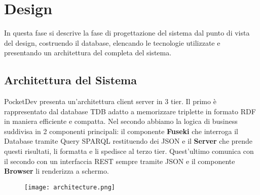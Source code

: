 \section{Design}
In questa fase si descrive la fase di progettazione del sistema dal punto di vista del design, costruendo il database, elencando le tecnologie utilizzate e presentando un architettura del completa del sistema.
\subsection{Architettura del Sistema}
PocketDev presenta un'architettura client server in 3 tier. Il primo è rappresentato dal database TDB adatto a memorizzare triplette in formato RDF in maniera efficiente e compatta. Nel secondo abbiamo la logica di business suddivisa in 2 componenti principali: il componente \textbf{Fuseki} che interroga il Database tramite Query SPARQL restituendo dei JSON e il \textbf{Server} che prende questi risultati, li formatta e li spedisce al terzo tier. Quest'ultimo comunica con il secondo con un interfaccia REST sempre tramite JSON e il componente \textbf{Browser} li renderizza a schermo. 
\begin{figure}[H]
 \texttt{[image: architecture.png]}
\end{figure}
